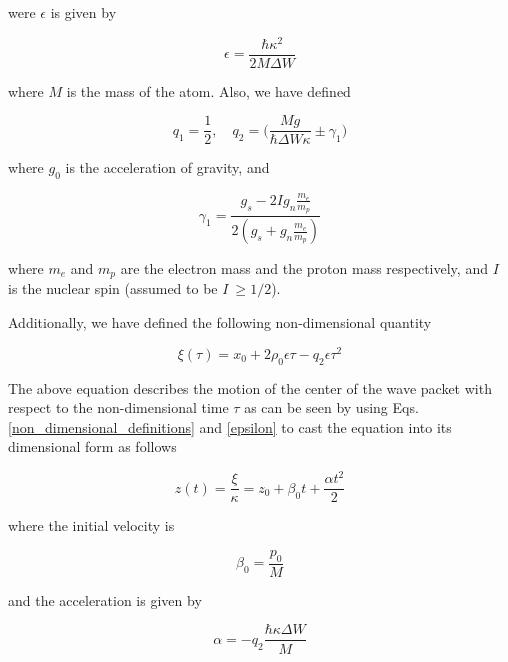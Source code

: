 \documentclass{article}
\begin{document}
were $\epsilon$ is given by 

\begin{equation}\label{epsilon}
\epsilon = \frac{\hbar \kappa^{2}}{2 M \Delta W}
\end{equation}

where $M$ is the mass of the atom. Also, we have defined

\begin{equation}\label{q1_q2}
q_{1} = \frac{1}{2} \mathrm{,}\quad q_{2} = \bigg(\frac{M g}{\hbar \Delta W \kappa} \pm  \gamma_{1} \bigg)
\end{equation}

where $g_{0}$ is the acceleration of gravity, and 

\begin{equation}\label{gamma_1}
\gamma_{1} = \frac{g_{s}-2 I g_{n} \frac{m_{e}}{m_{p}}}{2(g_{s}+g_{n}\frac{m_{e}}{m_{p}})}
\end{equation}

where $m_{e}$ and $m_{p}$ are the electron mass and the proton mass respectively, and $I$ is the nuclear spin (assumed to be $I\ \ge 1/2$).

Additionally, we have defined the following non-dimensional quantity

\begin{equation}\label{xi}
\xi(\tau) = x_{0} + 2 \rho_{0} \epsilon \tau - q_{2}\epsilon \tau^{2}
\end{equation}

The above equation describes the motion of the center of the wave packet with respect to the non-dimensional time $\tau$ as can be seen by using Eqs.\ref{non_dimensional_definitions} and \ref{epsilon} to cast the equation into its dimensional form as follows

\begin{equation}\label{xi_dimensional}
z(t) = \frac{\xi}{\kappa} = z_{0} +  \beta_{0} t +  \frac{\alpha t^{2}}{2}
\end{equation}

where the initial velocity is

\begin{equation}
\beta_{0} = \frac{p_{0}}{M}
\end{equation}

and the acceleration is given by

\begin{equation}\label{q2_a}
\alpha = -q_{2} \frac{ \hbar \kappa \Delta W}{M}
\end{equation}
\end{document}
